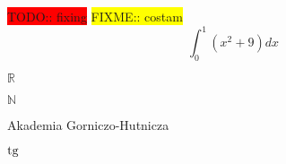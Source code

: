 \documentclass{standalone}
\begin{document}
\newcommand{\todo}[1]{\colorbox{red}{TODO:: #1}}
\todo{fixing}
\newcommand{\fixme}[1]{\colorbox{yellow}{FIXME:: #1}}
\fixme{costam}
\newcommand{\myint}[3]{$$\int_{#1}^{#2} (#3) dx$$}
\myint{0}{1}{x^2 + 9}

\def \R {$\mathbb{R}$}
\def \N {$\mathbb{N}$}
\def \agh {Akademia Gorniczo-Hutnicza}
\def \tg {$\rm{tg}$}

\R

\N

\agh

\tg
 
\end{document}
